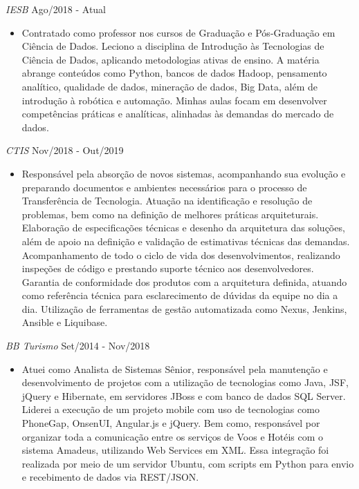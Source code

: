 \documentclass{res}
\begin{document}
\begin{resume}
		{\sl IESB} \hfill Ago/2018 - Atual
		\begin{itemize}
			\item Contratado como professor nos cursos de Graduação e Pós-Graduação em Ciência de Dados. Leciono a disciplina de Introdução às Tecnologias de Ciência de Dados, aplicando metodologias ativas de ensino. A matéria abrange conteúdos como Python, bancos de dados Hadoop, pensamento analítico, qualidade de dados, mineração de dados, Big Data, além de introdução à robótica e automação. Minhas aulas focam em desenvolver competências práticas e analíticas, alinhadas às demandas do mercado de dados.
		\end{itemize}
		
		{\sl CTIS} \hfill Nov/2018 - Out/2019
		\begin{itemize}
			\item Responsável pela absorção de novos sistemas, acompanhando sua evolução e preparando documentos e ambientes necessários para o processo de Transferência de Tecnologia. Atuação na identificação e resolução de problemas, bem como na definição de melhores práticas arquiteturais. Elaboração de especificações técnicas e desenho da arquitetura das soluções, além de apoio na definição e validação de estimativas técnicas das demandas. Acompanhamento de todo o ciclo de vida dos desenvolvimentos, realizando inspeções de código e prestando suporte técnico aos desenvolvedores. Garantia de conformidade dos produtos com a arquitetura definida, atuando como referência técnica para esclarecimento de dúvidas da equipe no dia a dia. Utilização de ferramentas de gestão automatizada como Nexus, Jenkins, Ansible e Liquibase.
		\end{itemize}
		
		{\sl BB Turismo} \hfill Set/2014 - Nov/2018
		\begin{itemize}
			\item Atuei como Analista de Sistemas Sênior, responsável pela manutenção e desenvolvimento de projetos com a utilização de tecnologias como Java, JSF, jQuery e Hibernate, em servidores JBoss e com banco de dados SQL Server. Liderei a execução de um projeto mobile com uso de tecnologias como PhoneGap, OnsenUI, Angular.js e jQuery. Bem como, responsável por organizar toda a comunicação entre os serviços de Voos e Hotéis com o sistema Amadeus, utilizando Web Services em XML. Essa integração foi realizada por meio de um servidor Ubuntu, com scripts em Python para envio e recebimento de dados via REST/JSON.
		\end{itemize}
		

\end{resume}
\end{document}
